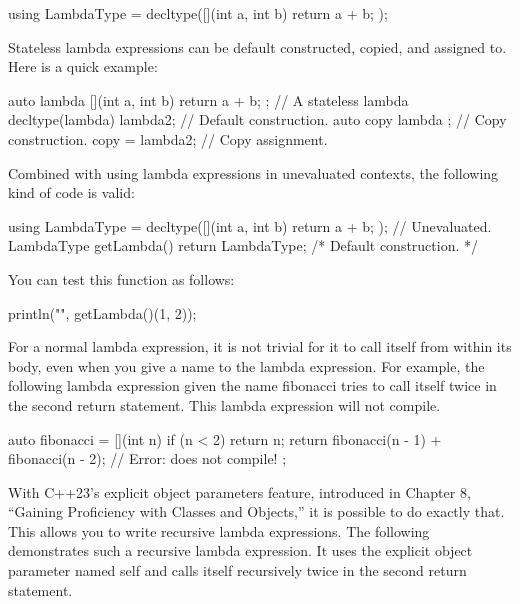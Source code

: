 \begin{cpp}
using LambdaType = decltype([](int a, int b) { return a + b; });
\end{cpp}


Stateless lambda expressions can be default constructed, copied, and assigned to. Here is a quick example:

\begin{cpp}
auto lambda { [](int a, int b) { return a + b; } }; // A stateless lambda
decltype(lambda) lambda2; // Default construction.
auto copy { lambda }; // Copy construction.
copy = lambda2; // Copy assignment.
\end{cpp}

Combined with using lambda expressions in unevaluated contexts, the following kind of code is valid:

\begin{cpp}
using LambdaType = decltype([](int a, int b) { return a + b; }); // Unevaluated.
LambdaType getLambda() { return LambdaType{}; /* Default construction. */ }
\end{cpp}

You can test this function as follows:

\begin{cpp}
println("{}", getLambda()(1, 2));
\end{cpp}



For a normal lambda expression, it is not trivial for it to call itself from within its body, even when you give a name to the lambda expression. For example, the following lambda expression given the name fibonacci tries to call itself twice in the second return statement. This lambda expression will not compile.

\begin{cpp}
auto fibonacci = [](int n) {
    if (n < 2) { return n; }
    return fibonacci(n - 1) + fibonacci(n - 2); // Error: does not compile!
};
\end{cpp}

With C++23’s explicit object parameters feature, introduced in Chapter 8, “Gaining Proficiency with Classes and Objects,” it is possible to do exactly that. This allows you to write recursive lambda expressions. The following demonstrates such a recursive lambda expression. It uses the explicit object parameter named self and calls itself recursively twice in the second return statement.

